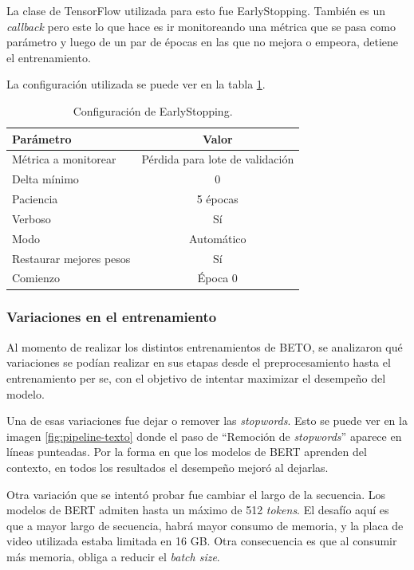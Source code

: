 La clase de TensorFlow utilizada para esto fue EarlyStopping. También es un \textit{callback} pero este lo que hace es ir monitoreando una métrica que se pasa como parámetro y luego de un par de épocas en las que no mejora o empeora, detiene el entrenamiento.

La configuración utilizada se puede ver en la tabla \ref{tab:earlystopping}.
\begin{table}[H]
	\centering
	\caption[Configuración EarlyStopping]{Configuración de EarlyStopping.}
	\begin{tabular}{l c}    
		\toprule
		\textbf{Parámetro}			& 			\textbf{Valor}  \\
		\midrule
		Métrica a monitorear		& 			Pérdida para lote de validación  \\
		Delta mínimo				& 			0 \\
		Paciencia					& 			5 épocas  \\
		Verboso						& 			Sí  \\
		Modo						& 			Automático  \\	
		Restaurar mejores pesos 	& 			Sí  \\
		Comienzo					& 			Época 0  \\	
		\bottomrule
		\hline
	\end{tabular}
	\label{tab:earlystopping}
\end{table}

\subsubsection{Variaciones en el entrenamiento}

Al momento de realizar los distintos entrenamientos de BETO, se analizaron qué variaciones se podían realizar en sus etapas desde el preprocesamiento hasta el entrenamiento per se, con el objetivo de intentar maximizar el desempeño del modelo. 

Una de esas variaciones fue dejar o remover las \textit{stopwords}. Esto se puede ver en la imagen \ref{fig:pipeline-texto} donde el paso de ``Remoción de \textit{stopwords}'' aparece en líneas punteadas. Por la forma en que los modelos de BERT aprenden del contexto, en todos los resultados el desempeño mejoró al dejarlas.

Otra variación que se intentó probar fue cambiar el largo de la secuencia. Los modelos de BERT admiten hasta un máximo de 512 \textit{tokens}. El desafío aquí es que a mayor largo de secuencia, habrá mayor consumo de memoria, y la placa de video utilizada estaba limitada en 16 GB. Otra consecuencia es que al consumir más memoria, obliga a reducir el \textit{batch size}.


